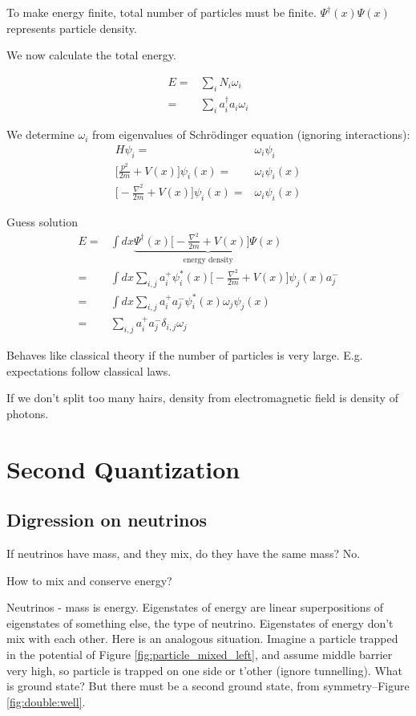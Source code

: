 \documentclass[]{article}
\begin{document}
To make energy finite, total number of particles must be finite. $\Psi^\dagger(x) \Psi(x)$ represents particle density.

We now calculate the total energy.

\begin{align*}
E =& \sum_{i} N_i \omega_i\\
=& \sum_{i} a^\dagger_i a_i \omega_i
\end{align*}

We determine $\omega_i$ from eigenvalues of Schr\"odinger equation (ignoring interactions):
\begin{align*}
H \psi_i =& \omega_i \psi_i\\
\big[\frac{p^2}{2m} + V(x)\big]\psi_i(x)=& \omega_i \psi_i(x)\\
\big[-\frac{\nabla^2}{2m} + V(x)\big]\psi_i(x)=& \omega_i \psi_i(x)
\end{align*}

Guess solution
\begin{align*}
E=&\int dx \underbrace{\Psi^\dagger(x) \big[-\frac{\nabla^2}{2m} + V(x)\big] \Psi(x)}_\text{energy density} \\
=& \int dx \sum_{i,j}a^+_i\psi_i^*(x)\big[-\frac{\nabla^2}{2m} + V(x)\big]\psi_j(x)a^-_j\\
=& \int dx \sum_{i,j} a^+_i a^-_j \psi_i^*(x) \omega_j \psi_j(x)\\
=&  \sum_{i,j} a^+_i a^-_j \delta_{i,j} \omega_j
\end{align*}

Behaves like classical theory if the number of particles is very large. E.g. expectations follow classical laws.

If we don't split too many hairs, density from electromagnetic field is density of photons.

\section {Second Quantization}

\subsection{Digression on neutrinos}

If neutrinos have mass, and they mix, do they have the same mass? No.

How to mix and conserve energy?

Neutrinos - mass is energy. Eigenstates of energy are linear superpositions of eigenstates of something else, the type of neutrino. Eigenstates of energy don't mix with each other. Here is an analogous situation. Imagine a particle trapped in the potential of Figure \ref{fig:particle_mixed_left}, and assume middle barrier very high, so particle is trapped on one side or t'other (ignore tunnelling). What is ground state? But there must be a second ground state, from symmetry--Figure \ref{fig:double:well}.
\end{document}
